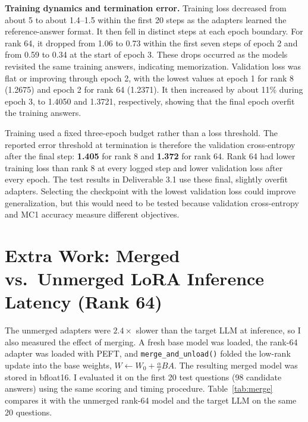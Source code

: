 \documentclass[11pt]{article}
\begin{document}
\textbf{Training dynamics and termination error.} Training loss decreased from about 5 to about 1.4--1.5 within the first 20 steps as the adapters learned the reference-answer format. It then fell in distinct steps at each epoch boundary. For rank 64, it dropped from 1.06 to 0.73 within the first seven steps of epoch 2 and from 0.59 to 0.34 at the start of epoch 3. These drops occurred as the models revisited the same training answers, indicating memorization. Validation loss was flat or improving through epoch 2, with the lowest values at epoch 1 for rank 8 (1.2675) and epoch 2 for rank 64 (1.2371). It then increased by about 11\% during epoch 3, to 1.4050 and 1.3721, respectively, showing that the final epoch overfit the training answers.

Training used a fixed three-epoch budget rather than a loss threshold. The reported error threshold at termination is therefore the validation cross-entropy after the final step: \textbf{1.405} for rank 8 and \textbf{1.372} for rank 64. Rank 64 had lower training loss than rank 8 at every logged step and lower validation loss after every epoch. The test results in Deliverable 3.1 use these final, slightly overfit adapters. Selecting the checkpoint with the lowest validation loss could improve generalization, but this would need to be tested because validation cross-entropy and MC1 accuracy measure different objectives.

\section*{Extra Work: Merged vs.\ Unmerged LoRA Inference Latency (Rank 64)}

The unmerged adapters were $2.4\times$ slower than the target LLM at inference, so I also measured the effect of merging. A fresh base model was loaded, the rank-64 adapter was loaded with PEFT, and \texttt{merge\_and\_unload()} folded the low-rank update into the base weights, $W \leftarrow W_0 + \frac{\alpha}{r}BA$. The resulting merged model was stored in bfloat16. I evaluated it on the first 20 test questions (98 candidate answers) using the same scoring and timing procedure. Table~\ref{tab:merge} compares it with the unmerged rank-64 model and the target LLM on the same 20 questions.
\end{document}
